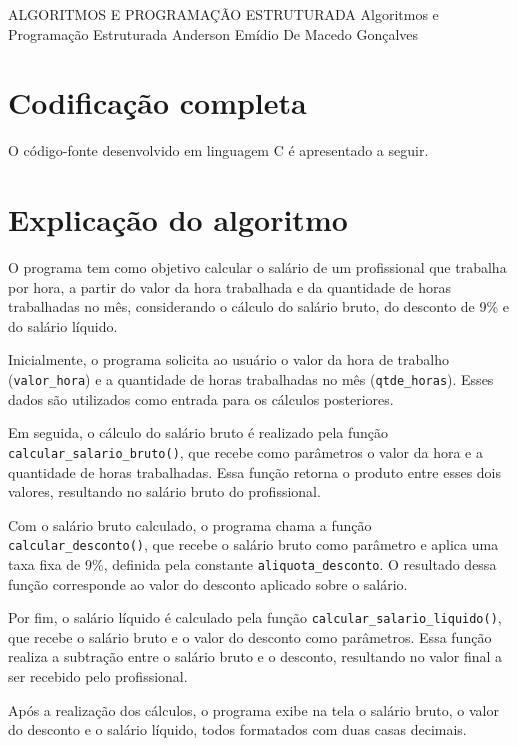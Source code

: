 \documentclass[12pt,a4paper]{article}
\begin{document}
\montarinicio
    {ALGORITMOS E PROGRAMAÇÃO ESTRUTURADA}
    {Algoritmos e Programação Estruturada}
    {Anderson Emídio De Macedo Gonçalves}

\section{Codificação completa}

O código-fonte desenvolvido em linguagem C é apresentado a seguir.

\lstset{language=C}



\newpage

\section{Explicação do algoritmo}

O programa tem como objetivo calcular o salário de um profissional que trabalha por hora, a partir do valor da hora trabalhada e da quantidade de horas trabalhadas no mês, considerando o cálculo do salário bruto, do desconto de 9\% e do salário líquido.

Inicialmente, o programa solicita ao usuário o valor da hora de trabalho (\texttt{valor\_hora}) e a quantidade de horas trabalhadas no mês (\texttt{qtde\_horas}). Esses dados são utilizados como entrada para os cálculos posteriores.

Em seguida, o cálculo do salário bruto é realizado pela função \texttt{calcular\_salario\_bruto()}, que recebe como parâmetros o valor da hora e a quantidade de horas trabalhadas. Essa função retorna o produto entre esses dois valores, resultando no salário bruto do profissional.

Com o salário bruto calculado, o programa chama a função \texttt{calcular\_desconto()}, que recebe o salário bruto como parâmetro e aplica uma taxa fixa de 9\%, definida pela constante \texttt{aliquota\_desconto}. O resultado dessa função corresponde ao valor do desconto aplicado sobre o salário.

Por fim, o salário líquido é calculado pela função \texttt{calcular\_salario\_liquido()}, que recebe o salário bruto e o valor do desconto como parâmetros. Essa função realiza a subtração entre o salário bruto e o desconto, resultando no valor final a ser recebido pelo profissional.

Após a realização dos cálculos, o programa exibe na tela o salário bruto, o valor do desconto e o salário líquido, todos formatados com duas casas decimais.
\end{document}
